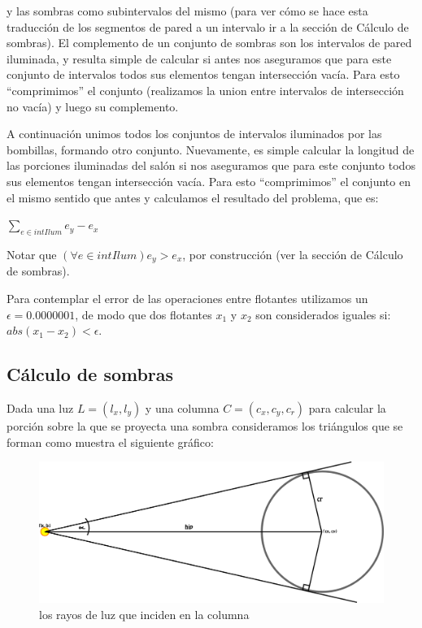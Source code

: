 y las sombras como subintervalos del mismo (para ver cómo se hace esta traducción de los segmentos
de pared a un intervalo ir a la sección de Cálculo de sombras).
El complemento de un conjunto de sombras son los intervalos de pared iluminada, y resulta simple
de calcular si antes nos aseguramos que para este conjunto de intervalos todos sus elementos tengan
intersección vacía. Para esto ``comprimimos'' el conjunto (realizamos la union entre intervalos de
intersección no vacía) y luego su complemento.

A continuación unimos todos los conjuntos de intervalos iluminados por las bombillas, formando
otro conjunto. Nuevamente, es simple calcular la longitud de las porciones iluminadas del salón
si nos aseguramos que para este conjunto todos sus elementos tengan intersección vacía. Para esto
``comprimimos'' el conjunto en el mismo sentido que antes y calculamos el resultado del problema,
que es:

\vspace{0.2cm}
\begin{center}$\displaystyle\sum_{e \in intIlum}e_y - e_x$\end{center}
\vspace{0.2cm}

Notar que $(\forall e \in intIlum)e_y > e_x$, por construcción (ver la sección de
Cálculo de sombras).

Para contemplar el error de las operaciones entre flotantes utilizamos un $\epsilon = 0.0000001$, 
de modo que dos flotantes $x_1$ y $x_2$ son considerados iguales si: $abs(x_1 - x_2) < \epsilon$.

\subsection*{Cálculo de sombras}
Dada una luz $L = (l_x, l_y)$ y una columna $C = (c_x, c_y, c_r)$ para calcular la porción sobre
la que se proyecta una sombra consideramos los triángulos que se forman como muestra el siguiente
gráfico:

\begin{figure}[H]
\centering
\label{bl_3}
\includegraphics[scale=1.0]{./figuras/bl_3.png}
\caption{los rayos de luz que inciden en la columna}
\end{figure} 

